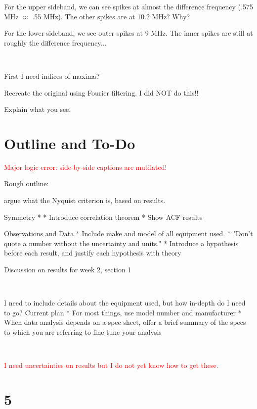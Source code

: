 \documentclass[a4paper]{article}
\begin{document}
For the upper sideband, we can see spikes at almost the difference frequency (.575 MHz $\approx$ .55 MHz). The other spikes are at 10.2 MHz? Why?

For the lower sideband, we see outer spikes at 9 MHz. The inner spikes are still at roughly the difference frequency...

\

First I need indices of maxima?

Recreate the original using Fourier filtering. I did NOT do this!!

Explain what you see.


\section{Outline and To-Do}

\textcolor{red}{Major logic error: side-by-side captions are mutilated!}


Rough outline:

argue what the Nyquist criterion is, based on results.

Symmetry
* 
* Introduce correlation theorem
* Show ACF results

Observations and Data
* Include make and model of all equipment used.
* "Don't quote a number without the uncertainty and units."
* Introduce a hypothesis before each result, and justify each hypothesis with theory


Discussion on results for week 2, section 1

\

I need to include details about the equipment used, but how in-depth do I need to go? Current plan
* For most things, use model number and manufacturer
* When data analysis depends on a spec sheet, offer a brief summary of the specs to which you are referring to fine-tune your analysis

\

\textcolor{red}{I need uncertainties on results but I do not yet know how to get these.}

\section{5}
\end{document}
